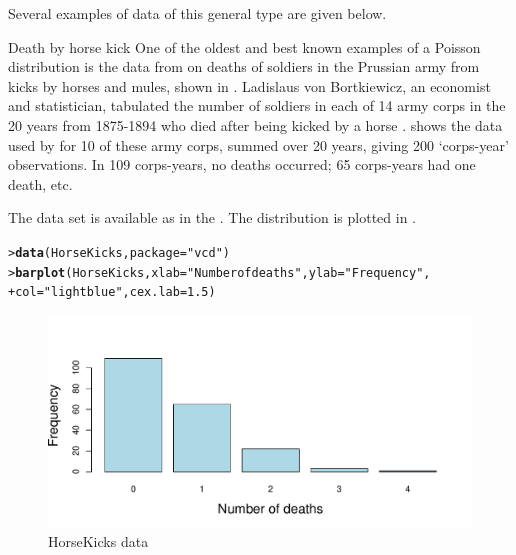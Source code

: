 \documentclass[10pt,krantz2]{krantz}\usepackage[]{graphicx}\usepackage[]{color}
\makeatletter
\newcommand{\hlnum}[1]{\textcolor[rgb]{0.686,0.059,0.569}{#1}}%
\newcommand{\hlstr}[1]{\textcolor[rgb]{0.192,0.494,0.8}{#1}}%
\newcommand{\hlstd}[1]{\textcolor[rgb]{0.345,0.345,0.345}{#1}}%
\newcommand{\hlkwc}[1]{\textcolor[rgb]{0.333,0.667,0.333}{#1}}%
\newcommand{\hlkwd}[1]{\textcolor[rgb]{0.737,0.353,0.396}{\textbf{#1}}}%
\newenvironment{kframe}{%
 \def\at@end@of@kframe{}%
 \ifinner\ifhmode%
  \def\at@end@of@kframe{\end{minipage}}%
  \begin{minipage}{\columnwidth}%
 \fi\fi%
 \def\FrameCommand##1{\hskip\@totalleftmargin \hskip-\fboxsep
 \colorbox{shadecolor}{##1}\hskip-\fboxsep
     \hskip-\linewidth \hskip-\@totalleftmargin \hskip\columnwidth}%
 \MakeFramed {\advance\hsize-\width
   \@totalleftmargin\z@ \linewidth\hsize
   \@setminipage}}%
 {\par\unskip\endMakeFramed%
 \at@end@of@kframe}
\newenvironment{knitrout}{}{} %
\renewenvironment{knitrout}{\small\renewcommand{\baselinestretch}{.85}}{} %
\makeatother
\begin{document}
Several examples of data of this general type are given below.

\begin{Example}[horsekick1]{Death by horse kick}
One of the oldest and best known examples of a Poisson distribution
is the data from
\citet{Bortkiewicz:98} on deaths of soldiers in the Prussian
army from kicks by horses and mules, shown in .
Ladislaus von Bortkiewicz, an economist and statistician,
tabulated the number of soldiers in each of
14 army corps in the 20 years from 1875-1894
who died after being kicked by a horse
\citep[p. 18]{AndrewsHerzberg:85}.
 shows the data used by
\citet{Fisher:25} for 10 of these
army corps, summed over 20 years, giving 200
`corps-year' observations.  In 109 corps-years,
no deaths occurred; 65 corps-years had one death, etc.

The data set is available as  in the .
The distribution is plotted in .


\begin{knitrout}
\color{fgcolor}\begin{kframe}
\begin{alltt}
\hlstd{> }\hlkwd{data}\hlstd{(HorseKicks,} \hlkwc{package} \hlstd{=} \hlstr{"vcd"}\hlstd{)}
\hlstd{> }\hlkwd{barplot}\hlstd{(HorseKicks,} \hlkwc{xlab} \hlstd{=} \hlstr{"Number of deaths"}\hlstd{,} \hlkwc{ylab} \hlstd{=} \hlstr{"Frequency"}\hlstd{,}
\hlstd{+ }        \hlkwc{col} \hlstd{=} \hlstr{"lightblue"}\hlstd{,} \hlkwc{cex.lab} \hlstd{=} \hlnum{1.5}\hlstd{)}
\end{alltt}
\end{kframe}\begin{figure}[!htbp]

\centerline{\includegraphics[width=.75\textwidth]{ch03/fig/horsekicks-1} }

\caption[HorseKicks data]{HorseKicks data\label{fig:horsekicks}}
\end{figure}


\end{knitrout}
\end{Example}
\end{document}

